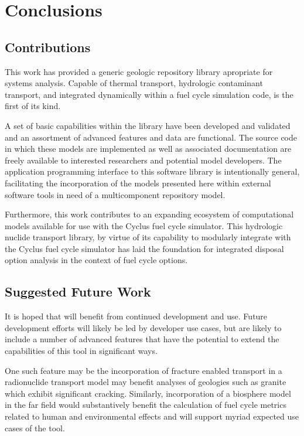 \chapter{Conclusions}\label{ch:conclusion}
\section{Contributions}

This work has provided a generic geologic repository library apropriate for 
systems analysis. Capable of thermal transport, hydrologic contaminant 
transport, and integrated dynamically within a fuel cycle simulation code,
\Cyder is the first of its kind. 

A set of basic capabilities within the \Cyder library have been developed and
validated and an assortment of advanced features and data are functional.
The \Cyder source code in which these models are implemented as well as 
associated documentation are freely available to interested researchers and 
potential model developers. The application programming interface to this 
software library is intentionally general, facilitating the incorporation of 
the models presented here within external software tools in need of a 
multicomponent repository model.

Furthermore, this work contributes to an expanding ecosystem of computational 
models available for use with the Cyclus fuel cycle simulator. This hydrologic 
nuclide transport library, by virtue of its capability to modularly integrate 
with the Cyclus fuel cycle simulator has laid the foundation for integrated 
disposal option analysis in the context of fuel cycle options. 

\section{Suggested Future Work}
It is hoped that \Cyder will benefit from continued development and use. Future 
development efforts will likely be led by developer use cases, but are likely 
to include a number of advanced features that have the potential to extend the 
capabilities of this tool in significant ways. 

One such feature may be the incorporation of fracture enabled transport in a 
radionuclide transport model may benefit analyses of geologies such as granite 
which exhibit significant cracking. Similarly, incorporation of a biosphere 
model in the far field would substantively benefit the calculation of fuel 
cycle metrics related to human and environmental effects and will support 
myriad expected use cases of the tool.
